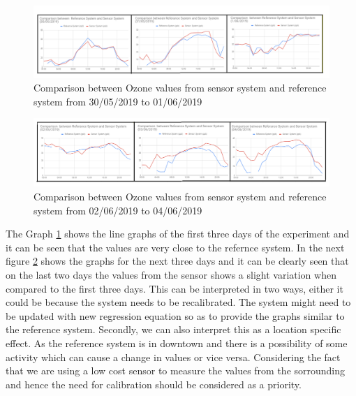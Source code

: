     
  \begin{figure}[h]
    \begin{center}
    \includegraphics[scale=0.70]{images/figure21.png}
    \end{center}
    \caption{Comparison between Ozone values from sensor system and reference system from 30/05/2019 to 01/06/2019}
    \label{Ozone}
    \bigskip



  \end{figure}
  \bigskip
  \begin{figure}[h]
    \begin{center}
    \includegraphics[scale=0.70]{images/figure22.png}
    \end{center}
    \caption{Comparison between Ozone values from sensor system and reference system from 02/06/2019 to 04/06/2019}
    \label{Ozone1}

  \end{figure}
  
The Graph \ref{Ozone} shows the line graphs of the first three days of the experiment and it can be seen that the values are very close to the refernce system. In the next figure \ref{Ozone1} shows the graphs for the next three days and it can be clearly seen that on the last two days the values from the sensor shows a slight variation when compared to the first three days. This can be interpreted in two ways, either it could be because the system needs to be recalibrated. The system might need to be updated with new regression equation so as to provide the graphs similar to the reference system. Secondly, we can also interpret this as a location specific effect. As the reference system is in downtown and there is a possibility of some activity which can cause a change in values or vice versa. Considering the fact that we are using a low cost sensor to measure the values from the sorrounding and hence the need for calibration should be considered as a priority. 







